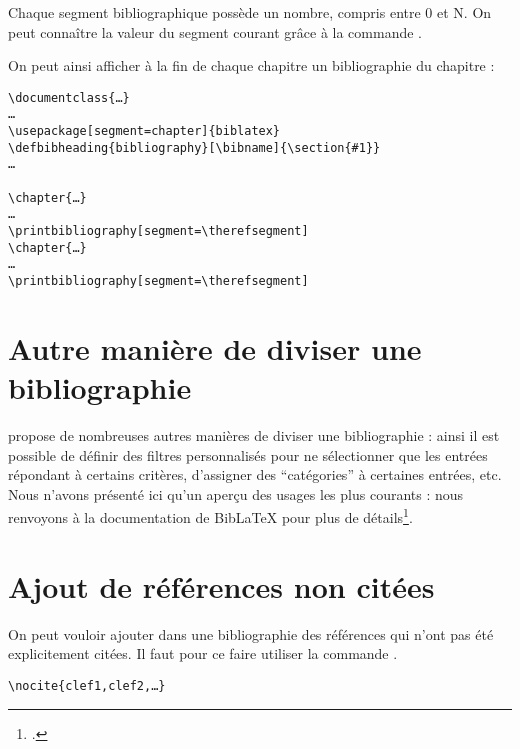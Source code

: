 Chaque segment bibliographique possède un nombre, compris entre 0 et N. On peut connaître la valeur du segment courant grâce à la commande .

On peut ainsi afficher à la fin de chaque chapitre un bibliographie du chapitre :

\begin{verbatim}
\documentclass{…}
…
\usepackage[segment=chapter]{biblatex}
\defbibheading{bibliography}[\bibname]{\section{#1}}
…

\chapter{…}
…
\printbibliography[segment=\therefsegment]
\chapter{…}
…
\printbibliography[segment=\therefsegment]

\end{verbatim}

\section{Autre manière de diviser une bibliographie}

 propose de nombreuses autres manières de diviser une bibliographie : ainsi il est possible de définir des filtres personnalisés pour ne sélectionner que les entrées répondant à certains critères, d'assigner des \enquote{catégories} à certaines entrées, etc. Nous n'avons présenté ici qu'un aperçu des usages les plus courants : nous renvoyons à la documentation de BibLaTeX pour plus de détails\footcite{biblatex_bibliographycommands}.

\section{Ajout de références non citées}

On peut vouloir ajouter dans une bibliographie des références qui n'ont pas été explicitement citées. Il faut pour ce faire utiliser la commande .

\begin{verbatim}
\nocite{clef1,clef2,…}
\end{verbatim}


